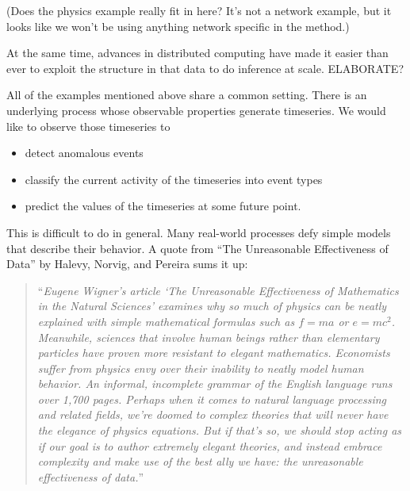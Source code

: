 (Does the physics example really fit in here? It's not a network example, but it looks like we won't be using anything network specific in the method.)


At the same time, advances in distributed computing have made it easier than ever to exploit the structure in that data to do inference at scale. ELABORATE?

All of the examples mentioned above share a common setting. There is an underlying process whose observable properties generate timeseries. We would like to observe those timeseries to 
\begin{itemize}
\item detect anomalous events
\item classify the current activity of the timeseries into event types
\item predict the values of the timeseries at some future point.
\end{itemize}

This is difficult to do in general. Many real-world processes defy simple models that describe their behavior. A quote from ``The Unreasonable Effectiveness of Data'' by Halevy, Norvig, and Pereira sums it up:
\begin{quote}
``{\em Eugene Wigner's article `The Unreasonable Effectiveness of Mathematics in the Natural Sciences' examines why so much of physics can be neatly explained with simple mathematical formulas such as $f = ma$ or $e = mc^2$. Meanwhile, sciences that involve human beings rather than elementary particles have proven more resistant to elegant mathematics. Economists suffer from physics envy over their inability to neatly model human behavior. An informal, incomplete grammar of the English language runs over 1,700 pages. Perhaps when it comes to natural language processing and related fields, we're doomed to complex theories that will never have the elegance of physics equations. But if that's so, we should stop acting as if our goal is to author extremely elegant theories, and instead embrace complexity and make use of the best ally we have: the unreasonable effectiveness of data.}''
\end{quote}

